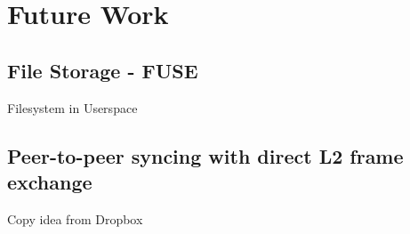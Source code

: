 \chapter{Future Work}



\section{File Storage - FUSE}
  Filesystem in Userspace

\section{Peer-to-peer syncing with direct L2 frame exchange}
  Copy idea from Dropbox